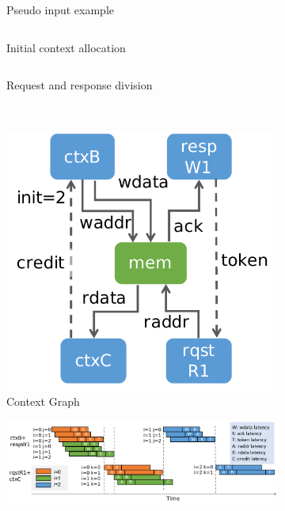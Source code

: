 \begin{figure}
\centering
\begin{subfigure}[b]{0.4\textwidth}
\inputminted{python}{code/spatialeg.py}
\caption{Pseudo input example}
\label{fig:contexteg}
\inputminted{python}{code/contextalloc.py}
\caption{Initial context allocation}
\end{subfigure}
\hfill
\begin{subfigure}[b]{0.5\textwidth}
\inputminted{python}{code/contextsplit.py}
\caption{Request and response division}
\end{subfigure} \\
\vspace{0.2cm}
\begin{subfigure}[b]{0.23\textwidth}
\includegraphics[width=1\textwidth]{figs/ctxdag.pdf}
\caption{Context Graph}
\end{subfigure}
\begin{subfigure}[b]{0.76\textwidth}
\includegraphics[width=1\textwidth]{figs/plasticinetiming.pdf}

\end{subfigure}
\end{figure}
